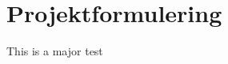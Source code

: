 \frontmatter
\maketitle
\newpage

\tableofcontents
\newpage
\listoffigures
\newpage

\mainmatter
\chapter{Projektformulering}
This is a major test